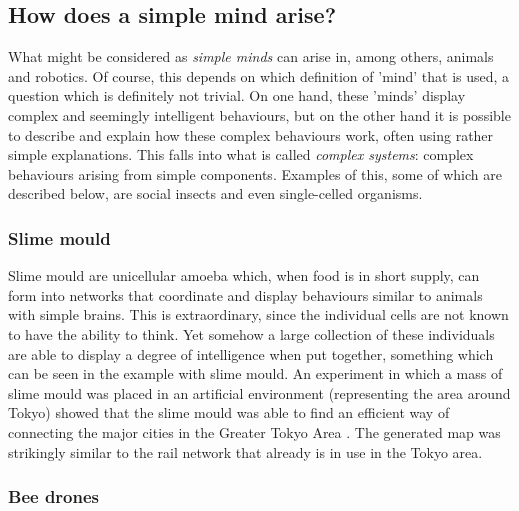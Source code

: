 \documentclass[11pt]{article}
\newenvironment{draft}{\color{dark-cornflower-blue-2}}{\ignorespacesafterend}
\begin{document}
\subsection{How does a simple mind arise?}

\begin{draft}

What might be considered as \textit{simple minds} can arise in, among others, animals and robotics. Of course, this depends on which definition of 'mind' that is used, a question which is definitely not trivial. On one hand, these 'minds' display complex and seemingly intelligent behaviours, but on the other hand it is possible to describe and explain how these complex behaviours work, often using rather simple explanations. This falls into what is called \textit{complex systems}: complex behaviours arising from simple components. Examples of this, some of which are described below, are social insects and even single-celled organisms.

\end{draft}

\subsubsection*{Slime mould}

\begin{draft}

Slime mould are unicellular amoeba which, when food is in short supply, can form into networks that coordinate and display behaviours similar to animals with simple brains. This is extraordinary, since the individual cells are not known to have the ability to think. Yet somehow a large collection of these individuals are able to display a degree of intelligence when put together, something which can be seen in the example with slime mould. An experiment in which a mass of slime mould was placed in an artificial environment (representing the area around Tokyo) showed that the slime mould was able to find an efficient way of connecting the major cities in the Greater Tokyo Area \cite{tero2010rules}. The generated map was strikingly similar to the rail network that already is in use in the Tokyo area.

\end{draft}

\subsubsection*{Bee drones}
\end{document}
